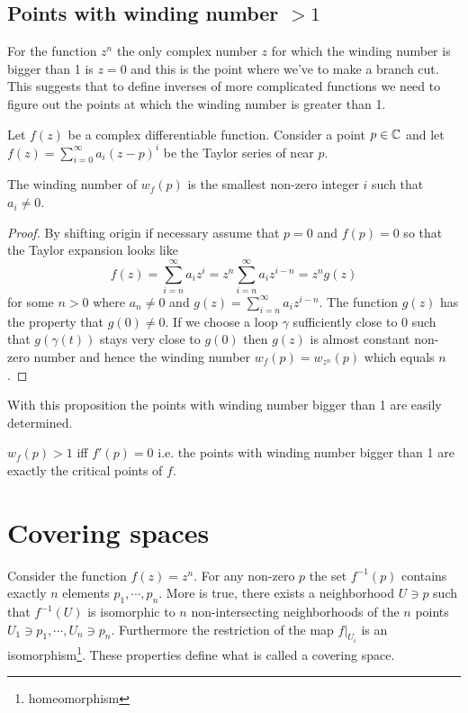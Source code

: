 \subsection{Points with winding number $> 1$}
For the function $z^n$ the only complex number $z$ for which the winding number is bigger than 1 is $z=0$ and this is the point where we've to make a branch cut. This suggests that to define inverses of more complicated functions we need to figure out the points at which the winding number is greater than 1.

Let $f(z)$ be a complex differentiable function. Consider a point $p \in \mathbb{C}$ and let $f(z) = \sum \limits_{i=0}^\infty a_i (z-p)^i$ be the Taylor series of near $p$.

\begin{proposition}
	\label{thm:windingNum}
	The winding number of $w_f(p)$ is the smallest non-zero integer $i$ such that $a_i \neq 0$.
\end{proposition}
\begin{proof}
	By shifting origin if necessary assume that $p=0$ and $f(p) = 0$ so that the Taylor expansion looks like $$f(z) = \sum \limits_{i=n}^\infty a_i z^i = z^n \sum \limits_{i=n}^\infty a_i z^{i-n} = z^n g(z) $$ for some $n > 0$ where $a_n \neq 0$ and $g(z) = \sum \limits_{i=n}^\infty a_i z^{i-n}$. The function $g(z)$ has the property that $g(0) \neq 0$. If we choose a loop $\gamma$ sufficiently close to $0$ such that $g(\gamma(t))$ stays very close to $g(0)$ then $g(z)$ is almost constant non-zero number and hence the winding number $w_f(p) = w_{z^n}(p)$ which equals $n$.
\end{proof}

With this proposition the points with winding number bigger than 1 are easily determined.
\begin{cor}
	$w_f(p) > 1$ iff $f'(p) = 0$ i.e. the points with winding number bigger than 1 are exactly the critical points of $f$.
\end{cor}


\section{Covering spaces}
Consider the function $f(z) = z^n$. For any non-zero $p$ the set $f^{-1}(p)$ contains exactly $n$ elements $p_1, \cdots, p_n$. More is true, there exists a neighborhood $U \ni p$ such that $f^{-1}(U)$ is isomorphic to $n$ non-intersecting neighborhoods of the $n$ points $U_1 \ni p_1, \cdots, U_n \ni p_n$. Furthermore the restriction of the map $f|_{U_i}$ is an isomorphism\footnote{homeomorphism}. These properties define what is called a covering space.

